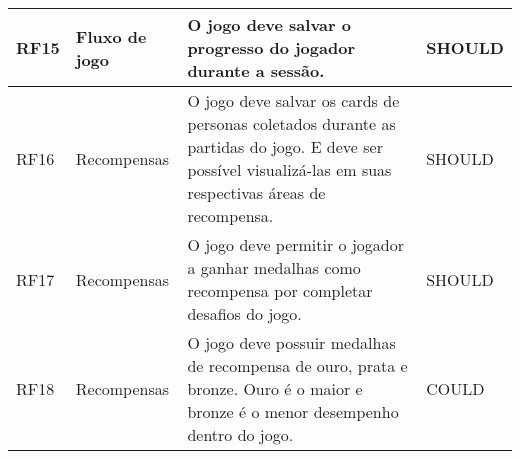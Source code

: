 \begin{table}[htbp]
\begin{tabular}{|p{0.9cm}|p{2.5cm}|p{9.3cm}|p{1.9cm}|}
\textcolor{textmodified}{RF15} & \textcolor{textmodified}{Fluxo de jogo}             & \textcolor{textmodified}{O jogo deve salvar o progresso do jogador durante a sessão.} & \textcolor{textadded}{SHOULD} \\ \hline

\textcolor{textmodified}{RF16} & \textcolor{textmodified}{Recompensas}                 & \textcolor{textmodified}{O jogo deve salvar os cards de personas coletados durante as partidas do jogo. E deve ser possível visualizá-las em suas respectivas áreas de recompensa.} & \textcolor{textadded}{SHOULD} \\ \hline

\textcolor{textadded}{RF17} & \textcolor{textadded}{Recompensas}                 & \textcolor{textadded}{O jogo deve permitir o jogador a ganhar medalhas como recompensa por completar desafios do jogo.} & \textcolor{textadded}{SHOULD} \\ \hline

\textcolor{textadded}{RF18} & \textcolor{textadded}{Recompensas}                 & \textcolor{textadded}{O jogo deve possuir medalhas de recompensa de ouro, prata e bronze. Ouro é o maior e bronze é o menor desempenho dentro do jogo.} & \textcolor{textadded}{COULD} \\ \hline

\end{tabular}
\end{table}
